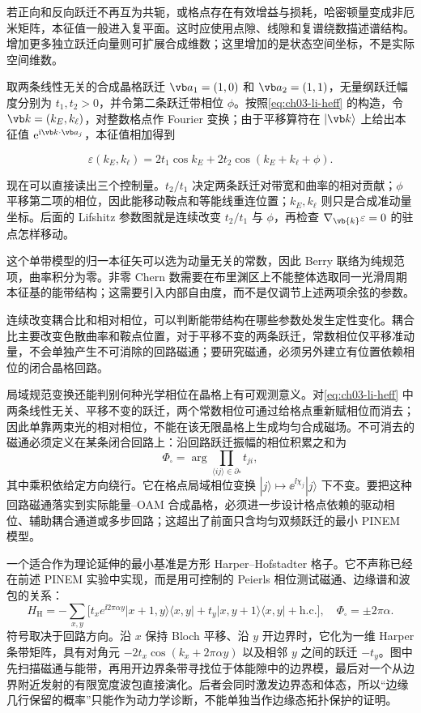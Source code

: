 若正向和反向跃迁不再互为共轭，或格点存在有效增益与损耗，哈密顿量变成非厄米矩阵，本征值一般进入复平面。这时应使用点隙、线隙和复谱绕数描述谱结构。增加更多独立跃迁向量则可扩展合成维数；这里增加的是状态空间坐标，不是实际空间维数。

取两条线性无关的合成晶格跃迁 $\vb a_1=(1,0)$ 和 $\vb a_2=(1,1)$，无量纲跃迁幅度分别为 $t_1,t_2>0$，并令第二条跃迁带相位 $\phi$。按照\cref{eq:ch03-li-heff} 的构造，令 $\vb k=(k_E,k_\ell)$，对整数格点作 Fourier 变换；由于平移算符在 $|\vb k\rangle$ 上给出本征值 $\ee^{\ii\vb k\cdot\vb a_j}$，本征值相加得到


\begin{equation*}
\varepsilon(k_E,k_\ell)=2t_1\cos k_E+2t_2\cos(k_E+k_\ell+\phi).
\end{equation*}


现在可以直接读出三个控制量。$t_2/t_1$ 决定两条跃迁对带宽和曲率的相对贡献；$\phi$ 平移第二项的相位，因此能移动鞍点和等能线重连位置；$k_E,k_\ell$ 则只是合成准动量坐标。后面的 Lifshitz 参数图就是连续改变 $t_2/t_1$ 与 $\phi$，再检查 $\nabla_{\vb{k}}\varepsilon=0$ 的驻点怎样移动。

这个单带模型的归一本征矢可以选为动量无关的常数，因此 Berry 联络为纯规范项，曲率积分为零。非零 Chern 数需要在布里渊区上不能整体选取同一光滑周期本征基的能带结构；这需要引入内部自由度，而不是仅调节上述两项余弦的参数。

连续改变耦合比和相对相位，可以判断能带结构在哪些参数处发生定性变化。耦合比主要改变色散曲率和鞍点位置，对于平移不变的两条跃迁，常数相位仅平移准动量，不会单独产生不可消除的回路磁通；要研究磁通，必须另外建立有位置依赖相位的闭合晶格回路。


局域规范变换还能判别何种光学相位在晶格上有可观测意义。对\cref{eq:ch03-li-heff} 中两条线性无关、平移不变的跃迁，两个常数相位可通过给格点重新赋相位而消去；因此单靠两束光的相对相位，不能在该无限晶格上生成均匀合成磁场。不可消去的磁通必须定义在某条闭合回路上：沿回路跃迁振幅的相位积累之和为
\begin{equation}
 \Phi_{\square}=\arg\!\prod_{\langle ij\rangle\in\partial\square} t_{ji},
 \label{eq:ch03-loop-flux}
\end{equation}
其中乘积依给定方向绕行。它在格点局域相位变换 $|j\rangle\mapsto \ee^{\ii\chi_j}|j\rangle$ 下不变。要把这种回路磁通落实到实际能量--OAM 合成晶格，必须进一步设计格点依赖的驱动相位、辅助耦合通道或多步回路；这超出了前面只含均匀双频跃迁的最小 PINEM 模型。

一个适合作为理论延伸的最小基准是方形 Harper--Hofstadter 格子。它不声称已经在前述 PINEM 实验中实现，而是用可控制的 Peierls 相位测试磁通、边缘谱和波包的关系：
\begin{equation}
 H_{\mathrm H}=-\sum_{x,y}\bigl[t_xe^{\ii2\pi\alpha y}|x{+}1,y\rangle\langle x,y|
 +t_y|x,y{+}1\rangle\langle x,y|+\mathrm{h.c.}\bigr],
 \quad \Phi_{\square}=\pm2\pi\alpha .
 \label{eq:ch03-hofstadter}
\end{equation}
符号取决于回路方向。沿 $x$ 保持 Bloch 平移、沿 $y$ 开边界时，它化为一维 Harper 条带矩阵，具有对角元 $-2t_x\cos(k_x+2\pi\alpha y)$ 以及相邻 $y$ 之间的跃迁 $-t_y$。图中先扫描磁通与能带，再用开边界条带寻找位于体能隙中的边界模，最后对一个从边界附近发射的有限宽度波包直接演化。后者会同时激发边界态和体态，所以“边缘几行保留的概率”只能作为动力学诊断，不能单独当作边缘态拓扑保护的证明。


